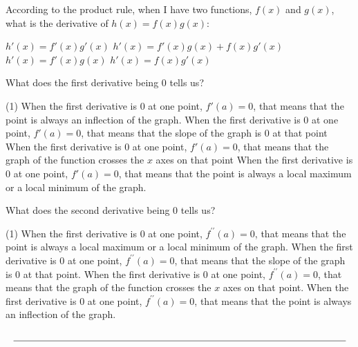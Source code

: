 \documentclass[12pt, noquestionbreak, flushbottom, customfontpath=../Fonts/]{../skrexam}  %
\begin{document}
\begin{questions}
	\question According to the product rule, when I have two functions, $f(x)$ and $g(x)$, what is the derivative of $h(x) = f(x) g(x)$:
	\begin{choices}
		\choice $h'(x) = f'(x) g '(x)$
		\choice\CorrectChoice $h'(x) = f'(x) g(x)+ f(x) g '(x)$
		\choice $h'(x) = f'(x) g(x)$
		\choice $h'(x) = f(x) g '(x)$
	\end{choices}

	\question What does the first derivative being 0 tells us?
	\begin{choices}(1)
		\choice When the first derivative is $0$ at one point, $f'(a) = 0$, that means that the point is always an inflection of the graph.
		\choice\CorrectChoice When the first derivative is $0$ at one point, $f'(a) = 0$, that means that the slope of the graph is $0$ at that point
		\choice When the first derivative is $0$ at one point, $f'(a) = 0$, that means that the graph of the function crosses the $x$ axes on that point
		\choice When the first derivative is $0$ at one point, $f'(a) = 0$, that means that the point is always a local maximum or a local minimum of the graph.
	\end{choices}

	\question What does the second derivative being 0 tells us?
	\begin{choices}(1)
		\choice When the first derivative is $0$ at one point, $f^{\prime \prime}(a) = 0$, that means that the point is always a local maximum or a local minimum of the graph.
		\choice When the first derivative is $0$ at one point, $f^{\prime \prime}(a) = 0$, that means that the slope of the graph is $0$ at that point.
		\choice When the first derivative is $0$ at one point, $f^{\prime \prime}(a) = 0$, that means that the graph of the function crosses the $x$ axes on that point.
		\choice\CorrectChoice When the first derivative is $0$ at one point, $f^{\prime \prime}(a) = 0$, that means that the point is always an inflection of the graph.
	\end{choices}

\end{questions}






\[
\underset{%
	}{%
	\text{\underline{\hspace{\textwidth}}}%
}
\]
\setcounter{totalpages}{\value{page}}
\setcounter{totalsections}{\value{section}}
\end{document}
